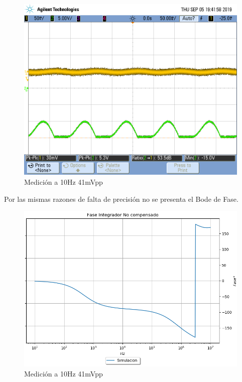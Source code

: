 \begin{figure}[H]
	\centering
	\includegraphics[width=\textwidth]{Ejercicio4/FOTOS-TP2-TC-EJ4/piso}
	\caption{Medición a 10Hz 41mVpp}
\end{figure}

Por las mismas razones de falta de precisión no se presenta el Bode de Fase.
\begin{figure}[H]
	\centering
	\includegraphics[width=\textwidth]{Ejercicio4/FASE-SIMULADO-INTEGRADOR-NO-COMPENSADO}
	\caption{Medición a 10Hz 41mVpp}
\end{figure}



